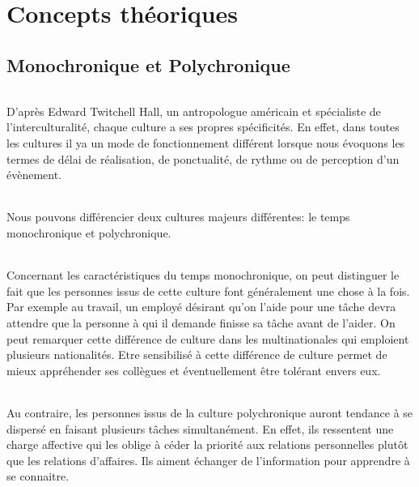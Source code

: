 \part{Concepts théoriques}

\chapter{Monochronique et Polychronique}

\paragraph{} D'après Edward Twitchell Hall, un antropologue américain et spécialiste de
l'interculturalité, chaque culture a ses propres spécificités. En effet, dans
toutes les cultures il ya un mode de fonctionnement différent lorsque nous
évoquons les termes de délai de réalisation, de ponctualité, de rythme ou de
perception d'un évènement.

\paragraph{} Nous pouvons différencier deux cultures majeurs différentes: le temps
monochronique et polychronique.

\paragraph{} Concernant les caractéristiques du temps monochronique, on peut distinguer le
fait que les personnes issus de cette culture font généralement une chose à la
fois. Par exemple au travail, un employé désirant qu'on l'aide pour une tâche
devra attendre que la personne à qui il demande finisse sa tâche avant de
l'aider. On peut remarquer cette différence de culture dans les multinationales
qui emploient plusieurs nationalités. Etre sensibilisé à cette différence de
culture permet de mieux appréhender ses collègues et éventuellement être
tolérant envers eux.

\paragraph{} Au contraire, les personnes issus de la culture polychronique
auront tendance à se dispersé en faisant plusieurs tâches simultanément. En
effet, ils ressentent une charge affective qui les oblige à céder la priorité
aux relations personnelles plutôt que les relations d'affaires. Ils aiment
échanger de l'information pour apprendre à se connaitre.

